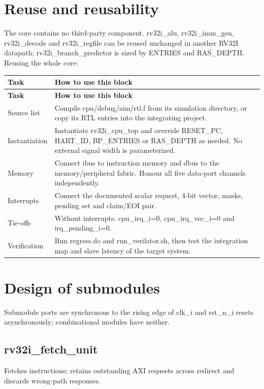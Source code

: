 \documentclass[11pt]{article}
\begin{document}
\clearpage
\section{Reuse and reusability}
\noindent The core contains no third-party component. rv32i\_alu, rv32i\_imm\_gen, rv32i\_decode and rv32i\_regfile can be reused unchanged in another RV32I datapath; rv32i\_branch\_predictor is sized by ENTRIES and RAS\_DEPTH. Reusing the whole core:\par\medskip
{\small
\begin{longtable}{@{}L{0.2300\dimexpr\linewidth-12pt\relax}L{0.7700\dimexpr\linewidth-12pt\relax}@{}}
\toprule
\textbf{Task} & \textbf{How to use this block} \\ \midrule
\endfirsthead
\toprule
\textbf{Task} & \textbf{How to use this block} \\ \midrule
\endhead
Source list & Compile cpu/debug/sim/rtl.f from its simulation directory, or copy its RTL entries into the integrating project. \\ \addlinespace[3pt]
Instantiation & Instantiate rv32i\_cpu\_top and override RESET\_PC, HART\_ID, BP\_ENTRIES or RAS\_DEPTH as needed. No external signal width is parameterized. \\ \addlinespace[3pt]
Memory & Connect ibus to instruction memory and dbus to the memory/peripheral fabric. Honour all five data-port channels independently. \\ \addlinespace[3pt]
Interrupts & Connect the documented scalar request, 4-bit vector, masks, pending set and claim/EOI pair. \\ \addlinespace[3pt]
Tie-offs & Without interrupts: cpu\_irq\_i=0, cpu\_irq\_vec\_i=0 and irq\_pending\_i=0. \\ \addlinespace[3pt]
Verification & Run regress.do and run\_verilator.sh, then test the integration map and slave latency of the target system. \\*
\bottomrule\end{longtable}}

\clearpage
\section{Design of submodules}
\noindent Submodule ports are synchronous to the rising edge of clk\_i and rst\_n\_i resets asynchronously; combinational modules have neither.\par\medskip
{}
\subsection{rv32i\_fetch\_unit}
Fetches instructions; retains outstanding AXI requests across redirect and discards wrong-path responses.
\end{document}

